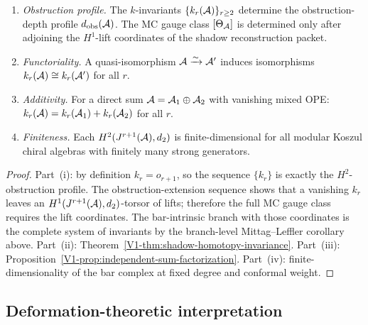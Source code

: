 \begin{proposition}
\begin{enumerate}[label=\textup{(\roman*)}]
\item \emph{Obstruction profile.}
The $k$-invariants $\{k_r(\mathcal{A})\}_{r \geq 2}$ determine the
obstruction-depth profile \(d_{\mathrm{obs}}(\mathcal{A})\).  The MC gauge
class \([\Theta_{\mathcal{A}}]\) is determined only after adjoining the
\(H^1\)-lift coordinates of the shadow reconstruction packet.

\item \emph{Functoriality.}
A quasi-isomorphism $\mathcal{A} \xrightarrow{\sim} \mathcal{A}'$ induces
isomorphisms $k_r(\mathcal{A}) \cong k_r(\mathcal{A}')$ for all $r$.

\item \emph{Additivity.}
For a direct sum $\mathcal{A} = \mathcal{A}_1 \oplus \mathcal{A}_2$ with
vanishing mixed OPE:
$k_r(\mathcal{A}) = k_r(\mathcal{A}_1) + k_r(\mathcal{A}_2)$ for all $r$.

\item \emph{Finiteness.}
Each $H^2(J^{r+1}(\mathcal{A}), d_2)$ is finite-dimensional
for all modular Koszul chiral algebras with
finitely many strong generators.
\end{enumerate}
\end{proposition}

\begin{proof}
Part~(i): by definition \(k_r=o_{r+1}\), so the sequence
\(\{k_r\}\) is exactly the \(H^2\)-obstruction profile.  The
obstruction-extension sequence shows that a vanishing \(k_r\) leaves an
\(H^1(J^{r+1}(\mathcal{A}),d_2)\)-torsor of lifts; therefore the full MC gauge
class requires the lift coordinates.  The bar-intrinsic branch with
those coordinates is the complete system of invariants by the
branch-level Mittag--Leffler corollary above.
Part~(ii):
Theorem~\ref{V1-thm:shadow-homotopy-invariance}.
Part~(iii):
Proposition~\ref{V1-prop:independent-sum-factorization}.
Part~(iv): finite-dimensionality of the bar complex at
fixed degree and conformal weight.
\end{proof}


\subsection{Deformation-theoretic interpretation}

